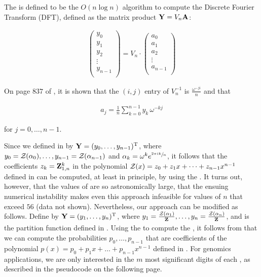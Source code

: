 The \fft is defined to be the $O(n \log n)$
algorithm to compute the Discrete Fourier Transform (DFT), defined
as the matrix product ${\bf Y} = V_n {\bf A}$:

\begin{align}
\label{eq:fftbor:dftMatrix}
\left(
\begin{array}{l}
y_0 \\
y_1 \\
y_2 \\
\vdots \\
y_{n-1} \\
\end{array}
\right)
= V_n \cdot
\left(
\begin{array}{l}
a_0 \\
a_1 \\
a_2 \\
\vdots \\
a_{n-1} \\
\end{array}
\right)
\end{align}

On page $837$ of \citep{cormen}, it is shown that the
$(i,j)$ entry of $V_n^{-1}$ is $\frac{\omega^{-j i}}{n}$
and that

\begin{align}
\label{eq:fftbor:aFromY}
a_j = \frac{1}{n} \sum_{k=0}^{n-1} y_k\,\omega^{-kj}
\end{align}

for $j=0,\dots,n-1$.

Since we defined \bfY in  by ${\bf Y} =
(y_0,\dots,y_{n-1})^{\text T}$, where
$y_0={\mathcal Z}_{}(\alpha_0),\dots,y_{n-1}={\mathcal Z}_{}(\alpha_{n-1})$
and $\alpha_k = \omega^k e^{\sfrac{2 \pi i k}{n}}$, it follows that the coefficients
$z_k={\bf Z}^{k}_{1,n}$ in the polynomial
${\mathcal Z}_{}(x) = z_0 + z_1 x + \dots + z_{n-1} x^{n-1}$ defined in
 can be computed, at least in principle,
by using the \fft. It turns out, however, that the values of
 are so astronomically large, that the ensuing numerical
instability makes even this approach infeasible for values of $n$
that exceed $56$ (data not shown).
Nevertheless, our approach can be modified as follows.
Define \bfY by ${\bf Y} = (y_1,\dots,y_n)^{\text T}$, where
$y_1=\frac{{\mathcal Z}_{}(\alpha_1)}{{\bf Z}^{}_{}},\dots,
y_{n}=\frac{{\mathcal Z}_{}(\alpha_n)}{{\bf Z}^{}_{}}$, and
\fullZ is the partition function defined in .
Using the \fft to compute the \idft, it follows from
 that we can compute the probabilities $p_0,\dots,p_{n-1}$
that are coefficients of the polynomial
$p(x) = p_0 + p_1 x + \dots + p_{n-1}x^{n-1}$
defined in . For genomics applications, we are
only interested in the $m$ most significant digits of each \pk, as described
in the pseudocode on the following page.
\medskip


